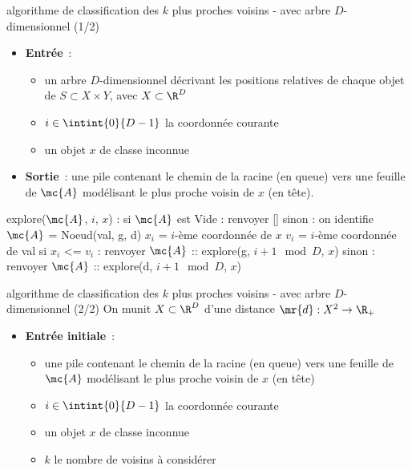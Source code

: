 \begin{adjustwidth}{-3cm}{-3cm}
\begin{implementation}{algorithme de classification des $k$ plus proches voisins - avec arbre $D$-dimensionnel (1/2)}
    \begin{itemize}
        \item \textbf{Entrée}~: \begin{itemize}
            \item un arbre $D$-dimensionnel décrivant les positions relatives de chaque objet de $S \subset X \times Y$, avec $X \subset \R^D$
            \item $i \in \intint{0}{D-1}$ la coordonnée courante
            \item un objet $x$ de classe inconnue
        \end{itemize}
        \item \textbf{Sortie}~: une pile contenant le chemin de la racine (en queue) vers une feuille de $\mc{A}$ modélisant le plus proche voisin de $x$ (en tête).
    \end{itemize}
    \begin{lstLNat}
    explore($\mc{A}$, $i$, $x$) :
        si $\mc{A}$ est Vide :
            renvoyer []
        sinon :
            on identifie $\mc{A}$ = Noeud(val, g, d)
            $x_i$ = $i$-ème coordonnée de $x$
            $v_i$ = $i$-ème coordonnée de val
            si $x_i$ <= $v_i$ :
                renvoyer $\mc{A}$ :: explore(g, $i+1 \mod D$, $x$)
            sinon : 
                renvoyer $\mc{A}$ :: explore(d, $i+1 \mod D$, $x$)
    \end{lstLNat}
\end{implementation}

\begin{implementation}{algorithme de classification des $k$ plus proches voisins - avec arbre $D$-dimensionnel (2/2)}
    On munit $X \subset \R^D$ d'une distance $\mr{d} : X^2 \to \R_+$
    \begin{itemize}
        \item \textbf{Entrée initiale}~: \begin{itemize}
            \item une pile contenant le chemin de la racine (en queue) vers une feuille de $\mc{A}$ modélisant le plus proche voisin de $x$ (en tête)
            \item $i \in \intint{0}{D-1}$ la coordonnée courante
            \item un objet $x$ de classe inconnue
            \item $k$ le nombre de voisins à considérer
            

\end{itemize}
\end{itemize}
\end{implementation}
\end{adjustwidth}
